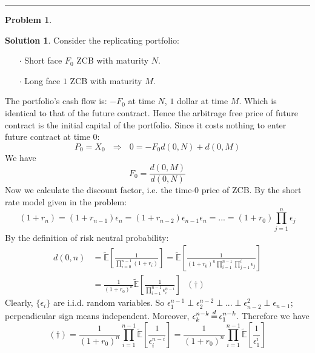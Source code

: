 \documentclass[a4paper, 10pt]{article}
\theoremstyle{definition}
\newtheorem{problem}{Problem}
\theoremstyle{hSol}
\newtheorem*{solution}{Solution}
\begin{document}
\noindent\rule{16cm}{0.4pt}
\begin{problem} 
\end{problem}
\begin{solution} Consider the replicating portfolio:
\begin{itemize}
  \item[$\cdot$] Short face $F_0$ ZCB with maturity $N$.
  \item[$\cdot$] Long face $1$ ZCB with maturity $M$.
\end{itemize}
The portfolio's cash flow is: $-F_0$ at time $N$, $1$ dollar at time $M$. Which is identical to that of the future contract. Hence the arbitrage free price of future contract is the initial capital of the portfolio. Since it costs nothing to enter future contract at time $0$:
$$
P_0 = X_0 ~~~\Rightarrow~~~0 = - F_0 d(0, N) + d(0,M)
$$
We have 
\begin{equation}
  F_0 = \frac{d(0,M)}{d(0, N)}
\end{equation}
Now we calculate the discount factor, i.e. the time-0 price of ZCB. By the short rate model given in the problem: 
\begin{equation}
  (1+r_n) = (1+r_{n-1})\epsilon_{n} =  (1+r_{n-2})\epsilon_{n-1}\epsilon_{n} = ... = (1+r_0) \prod_{j=1}^n \epsilon_j
\end{equation}
By the definition of risk neutral probability:
\begin{equation}
  \begin{split}
    d(0, n) &= \tilde{\mathbb{E}}\left[\frac{1}{\prod_{i=0}^{n-1} (1+r_i)}\right] = \tilde{\mathbb{E}}\left[\frac{1}{(1+r_0)^n\prod_{i=1}^{n-1} \prod_{j=1}^i \epsilon_j}\right] \\
    &= \frac{1}{(1+r_0)^n} \tilde{\mathbb{E}}\left[\frac{1}{\prod_{i=1}^{n-1} \epsilon_i^{n-i}}\right]~~~(\dag)
  \end{split}
\end{equation}
Clearly, $\{\epsilon_i\}$ are i.i.d. random variables. So $\epsilon_1^{n-1} \perp \epsilon_2^{n-2} \perp ...\perp \epsilon_{n-2}^2 \perp \epsilon_{n-1} $; perpendicular sign means independent. Moreover, $\epsilon_k^{n-k} \,{\buildrel d \over =}\, \epsilon_1^{n-k}$. Therefore we have
\begin{equation}
   (\dag)= \frac{1}{(1+r_0)^n} \prod_{i=1}^{n-1}\tilde{\mathbb{E}}\left[\frac{1}{\epsilon_i^{n-i}}\right] = \frac{1}{(1+r_0)^n} \prod_{i=1}^{n-1}\tilde{\mathbb{E}}\left[\frac{1}{\epsilon_1^{i}}\right]
\end{equation} 

\end{solution}
\end{document}
